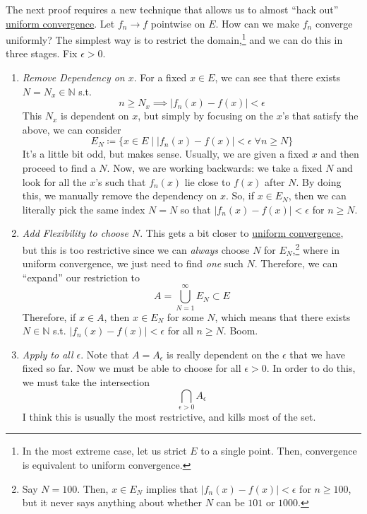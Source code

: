   The next proof requires a new technique that allows us to almost ``hack out'' \hyperref[pst-def:uniform-convergence]{uniform convergence}. Let $f_n \to f$ pointwise on $E$. How can we make $f_n$ converge uniformly? The simplest way is to restrict the domain,\footnote{In the most extreme case, let us strict $E$ to a single point. Then, convergence is equivalent to uniform convergence.} and we can do this in three stages. Fix $\epsilon > 0$. 
  \begin{enumerate}
    \item \textit{Remove Dependency on $x$}. 
    For a fixed $x \in E$, we can see that there exists $N = N_x \in \mathbb{N}$ s.t. 
    \begin{equation}
      n \geq N_x \implies |f_n (x) - f(x)| < \epsilon
    \end{equation}
    This $N_x$ is dependent on $x$, but simply by focusing on the $x$'s that satisfy the above, we can consider 
    \begin{equation}
      E_N \coloneqq \{x \in E \mid |f_n (x) - f(x)| < \epsilon \; \forall n \geq N \}
    \end{equation}
    It's a little bit odd, but makes sense. Usually, we are given a fixed $x$ and then proceed to find a $N$. Now, we are working backwards: we take a fixed $N$ and look for all the $x$'s such that $f_n(x)$ lie close to $f(x)$ after $N$. By doing this, we manually remove the dependency on $x$. So, if $x \in E_N$, then we can literally pick the same index $N = N$ so that $|f_n (x) - f(x)| < \epsilon$ for $n \geq N$. 

    \item \textit{Add Flexibility to choose $N$}. This gets a bit closer to \hyperref[pst-def:uniform-convergence]{uniform convergence}, but this is too restrictive since we can \textit{always} choose $N$ for $E_N$,\footnote{Say $N = 100$. Then, $x \in E_N$ implies that $|f_n (x) - f(x)| < \epsilon$ for $n \geq 100$, but it never says anything about whether $N$ can be $101$ or $1000$.} where in uniform convergence, we just need to find \textit{one} such $N$. Therefore, we can ``expand'' our restriction to 
    \begin{equation}
      A = \bigcup_{N = 1}^\infty E_N  \subset E
    \end{equation}
    Therefore, if $x \in A$, then $x \in E_N$ for some $N$, which means that there exists $N \in \mathbb{N}$ s.t. $|f_n (x) - f(x)| < \epsilon$ for all $n \geq N$. Boom. 

    \item \textit{Apply to all $\epsilon$}. Note that $A = A_\epsilon$ is really dependent on the $\epsilon$ that we have fixed so far. Now we must be able to choose for all $\epsilon > 0$. In order to do this, we must take the intersection 
    \begin{equation}
      \bigcap_{\epsilon > 0} A_\epsilon
    \end{equation}
    I think this is usually the most restrictive, and kills most of the set. 
  \end{enumerate}

